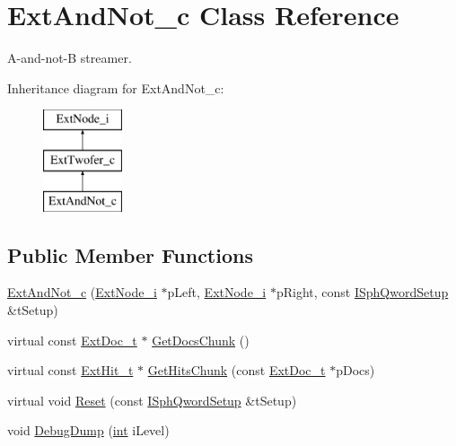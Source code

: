 \hypertarget{classExtAndNot__c}{\section{Ext\-And\-Not\-\_\-c Class Reference}
\label{classExtAndNot__c}
}


A-\/and-\/not-\/\-B streamer.  


Inheritance diagram for Ext\-And\-Not\-\_\-c\-:\begin{figure}[H]
\begin{center}
\leavevmode
\includegraphics[height=3.000000cm]{classExtAndNot__c}
\end{center}
\end{figure}
\subsection*{Public Member Functions}
\begin{DoxyCompactItemize}
\item 
\hyperlink{classExtAndNot__c_addd695c066e7a8265882315090f42385}{Ext\-And\-Not\-\_\-c} (\hyperlink{classExtNode__i}{Ext\-Node\-\_\-i} $\ast$p\-Left, \hyperlink{classExtNode__i}{Ext\-Node\-\_\-i} $\ast$p\-Right, const \hyperlink{classISphQwordSetup}{I\-Sph\-Qword\-Setup} \&t\-Setup)
\item 
virtual const \hyperlink{structExtDoc__t}{Ext\-Doc\-\_\-t} $\ast$ \hyperlink{classExtAndNot__c_ab561e62a94d58d08de9f5e4ca3a70ae7}{Get\-Docs\-Chunk} ()
\item 
virtual const \hyperlink{structExtHit__t}{Ext\-Hit\-\_\-t} $\ast$ \hyperlink{classExtAndNot__c_affd315ec571eccb14af88610cd3be848}{Get\-Hits\-Chunk} (const \hyperlink{structExtDoc__t}{Ext\-Doc\-\_\-t} $\ast$p\-Docs)
\item 
virtual void \hyperlink{classExtAndNot__c_a76ce32036d4c0a36ea0eeba592160876}{Reset} (const \hyperlink{classISphQwordSetup}{I\-Sph\-Qword\-Setup} \&t\-Setup)
\item 
void \hyperlink{classExtAndNot__c_aadb39adb2d4e776f6afcf62da33f2cb9}{Debug\-Dump} (\hyperlink{sphinxexpr_8cpp_a4a26e8f9cb8b736e0c4cbf4d16de985e}{int} i\-Level)
\end{DoxyCompactItemize}

